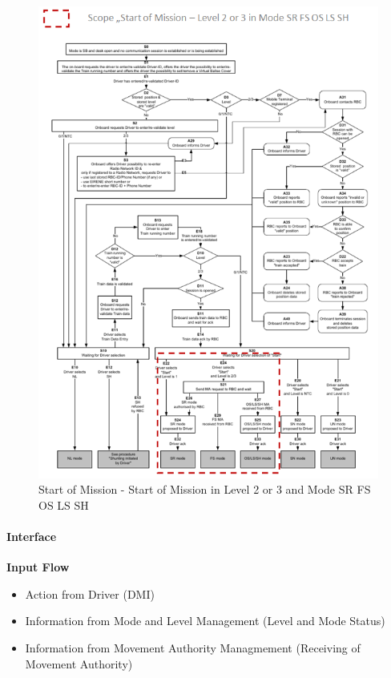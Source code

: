 \begin{figure}[h]
\centering
\includegraphics[scale=0.7]{images/SoMLevel2_3_SR_FS_OS_LS_SH}
\caption{Start of Mission - Start of Mission in Level 2 or 3 and Mode SR FS OS LS SH}
\label{Start of Mission - Start of Mission in Level 2 or 3 and Mode SR FS OS LS SH}
\end{figure}
\clearpage

\newpage

\paragraph{Interface}
\textbf{Input Flow}
\begin{itemize}
\item Action from Driver (DMI)
\item Information from Mode and Level Management (Level and Mode Status)
\item Information from Movement Authority Managmement (Receiving of Movement Authority)
\end{itemize}

